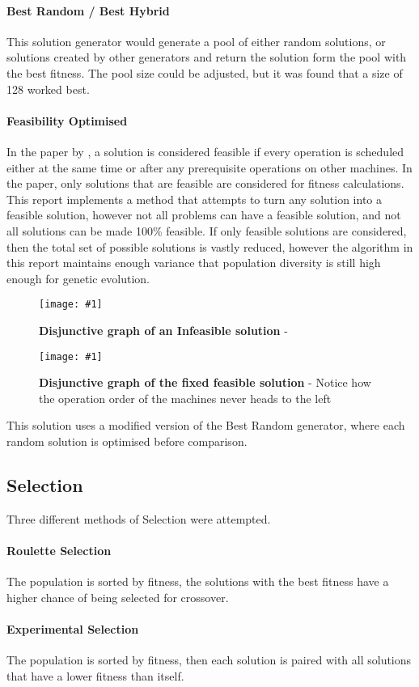 \documentclass[14pt]{acmsiggraph}
\newcommand{\figuremacroW}[4]{
	\begin{figure}[h] %
		\centering
		\texttt{[image: \#1]}
		\caption[#2]{\textbf{#2} - #3}
		\label{fig:#1}
	\end{figure}
}
\begin{document}
\paragraph{Best Random / Best Hybrid}
This solution generator would generate a pool of either random solutions, or solutions created by other generators and return the solution form the pool with the best fitness. The pool size could be adjusted, but it was found that a size of 128 worked best.

\paragraph{Feasibility Optimised}
In the paper by \cite{wang2012new}, a solution is considered feasible if every operation is scheduled either at the same time or after any prerequisite operations on other machines. In the paper, only solutions that are feasible are considered for fitness calculations. This report implements a method that attempts to turn any solution into a feasible solution, however not all problems can have a feasible solution, and not all solutions can be made 100\% feasible. If only feasible solutions are considered, then the total set of possible solutions is vastly reduced, however the algorithm in this report maintains enough variance that population diversity is still high enough for genetic evolution. 

\figuremacroW
{infeasible}
{Disjunctive graph of an Infeasible solution}
{\cite{wang2012new}}
{1.0}
\figuremacroW
{good}
{Disjunctive graph of the fixed feasible solution}
{Notice how the operation order of the machines never heads to the left\cite{wang2012new}}
{1.0}

This solution uses a modified version of the Best Random generator, where each random solution is optimised before comparison.

\subsection{Selection}
Three different methods of Selection were attempted.

\paragraph{Roulette Selection}
The population is sorted by fitness, the solutions with the best fitness have a higher chance of being selected for crossover.

\paragraph{Experimental Selection}
The population is sorted by fitness, then each solution is paired with all solutions that have a lower fitness than itself.
\end{document}
